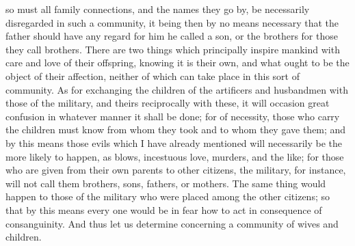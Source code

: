 so must all family connections, and the names they go by, be necessarily
disregarded in such a community, it being then by no means necessary that
the father should have any regard for him he called a son, or the brothers
for those they call brothers. There are two things which principally
inspire mankind with care and love of their offspring, knowing it is their
own, and what ought to be the object of their affection, neither of which
can take place in this sort of community. As for exchanging the children
of the artificers and husbandmen with those of the military, and theirs
reciprocally with these, it will occasion great confusion in whatever
manner it shall be done; for of necessity, those who carry the children
must know from whom they took and to whom they gave them; and by this
means those evils which I have already mentioned will necessarily be the
more likely to happen, as blows, incestuous love, murders, and the like;
for those who are given from their own parents to other citizens, the
military, for instance, will not call them brothers, sons, fathers, or
mothers. The same thing would happen to those of the military who were
placed among the other citizens; so that by this means every one would be
in fear how to act in consequence of consanguinity. And thus let us
determine concerning a community of wives and children.


